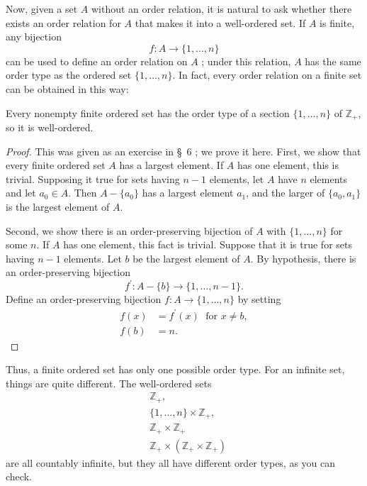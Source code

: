 Now, given a set \(A\) without an order relation, it is natural to ask whether there 
exists an order relation for \(A\) that makes it into a well-ordered set. 
If \(A\) is finite, any bijection
\[
f : A \rightarrow \{1,\ldots, n\}
\]
can be used to define an order relation on \(A\) ; under this relation, 
\(A\) has the same order type as the ordered set \(\{1,\ldots, n\}\). 
In fact, every order relation on a finite set can be obtained in this way:

\begin{theorem}
\label{thm:\thetheorem}
 Every nonempty finite ordered set has the order type of a section \(\{1,\ldots, n\}\) of \(\mathbb{Z}_{+}\), so it is well-ordered.
\end{theorem}

\begin{proof}
 This was given as an exercise in \S\ 6 ; we prove it here. First, we show that every finite ordered set \(A\) has a largest element. If \(A\) has one element, this is trivial. Supposing it true for sets having \(n - 1\) elements, let \(A\) have \(n\) elements and let \(a_{0} \in A\). Then \(A - \{ a_{0}\}\) has a largest element \(a_{1}\), and the larger of \(\{ {a_{0},a_{1}}\}\) is the largest element of \(A\).

 Second, we show there is an order-preserving bijection of \(A\) with \(\{1,\ldots, n\}\) for some \(n\). If \(A\) has one element, this fact is trivial. Suppose that it is true for sets having \(n - 1\) elements. Let \(b\) be the largest element of \(A\). By hypothesis, there is an order-preserving bijection
 \[
 f^{\prime } : A - \{ b\} \rightarrow \{1,\ldots, n - 1\}.
 \]
 Define an order-preserving bijection \(f : A \rightarrow \{1,\ldots, n\}\) by setting
 \[
 \begin{aligned}
 f(x) &= f^{\prime }(x) \;\text{ for }x \neq b, \\
 f(b) &= n\text{.}
 \end{aligned}
 \]
\end{proof}

Thus, a finite ordered set has only one possible order type. For an infinite set, 
things are quite different. The well-ordered sets
\[
\begin{aligned}
&\mathbb{Z}_{+}\text{, } \\
&\{1,\ldots, n\} \times {\mathbb{Z}}_{+}, \\
&\mathbb{Z}_{+} \times {\mathbb{Z}}_{+} \\
&\mathbb{Z}_{+} \times ({\mathbb{Z}_{+} \times {\mathbb{Z}}_{+}})
\end{aligned}
\]
are all countably infinite, but they all have different order types, as you can check.

